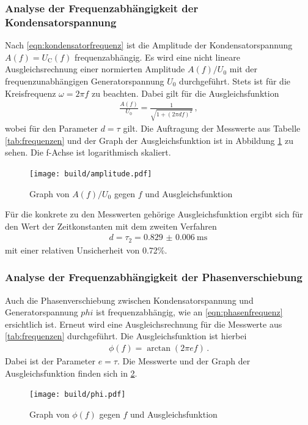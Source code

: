 \subsubsection{Analyse der Frequenzabhängigkeit der Kondensatorspannung}

Nach \eqref{eqn:kondensatorfrequenz} ist die Amplitude der Kondensatorspannung
$A(f) = U_\text{C}(f)$ frequenzabhängig. Es wird eine nicht lineare Ausgleichsrechnung
einer normierten Amplitude $A(f)/U_0$ mit der frequenzunabhängigen Generatorspannung $U_0$
durchgeführt. Stets ist für die Kreisfrequenz $\omega = 2πf$ zu beachten.
Dabei gilt für die Ausgleichsfunktion
\begin{align}
  \frac{A(f)}{U_0} = \frac{1}{\sqrt{1+(2πdf)^2}}\,,
\end{align}
wobei für den Parameter $d = \tau$ gilt.
Die Auftragung der Messwerte aus Tabelle \ref{tab:frequenzen} und der Graph der Ausgleichsfunktion ist in Abbildung \ref{fig:amplitude}
zu sehen. Die f-Achse ist logarithmisch skaliert.

\begin{figure}
  \centering
  \texttt{[image: build/amplitude.pdf]}
  \caption{Graph von $A(f)/U_0$ gegen $f$ und Ausgleichsfunktion}
  \label{fig:amplitude}
\end{figure}

Für die konkrete zu den Messwerten gehörige Ausgleichsfunktion ergibt sich für den Wert der Zeitkonstanten mit dem zweiten Verfahren
\begin{align}
  d = \tau_2 = \SI{0.829(0006)}{\milli\second}\,
\end{align}
mit einer relativen Unsicherheit von 0.72\%.

\subsubsection{Analyse der Frequenzabhängigkeit der Phasenverschiebung}

Auch die Phasenverschiebung zwischen Kondensatorspannung und Generatorspannung $phi$
ist frequenzabhängig, wie an \eqref{eqn:phasenfrequenz} ersichtlich ist.
Erneut wird eine Ausgleichsrechnung für die Messwerte aus \ref{tab:frequenzen}
durchgeführt. Die Ausgleichsfunktion ist hierbei
\begin{align}
  \phi(f) = \arctan(2πef)\,.
\end{align}
Dabei ist der Parameter $e = \tau$. Die Messwerte und der Graph der Ausgleichsfunktion finden sich
in \ref{fig:phiplot}.

\begin{figure}
  \centering
  \texttt{[image: build/phi.pdf]}
  \caption{Graph von $\phi(f)$ gegen $f$ und Ausgleichsfunktion}
  \label{fig:phiplot}
\end{figure}

